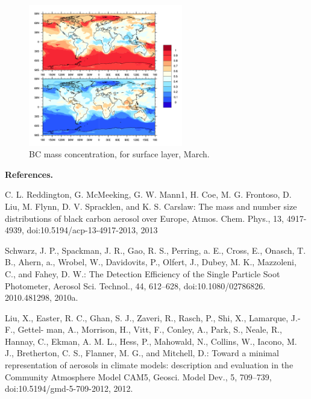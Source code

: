 \documentclass[11pt]{article}
\begin{document}
\begin{figure}[!h] 
	\begin{center}
		\includegraphics[width = 0.6\textwidth]{Rplot04}
		\caption[]{\label{fig_P3}BC mass concentration, for surface layer, March.}
	\end{center}
\end{figure}



\clearpage
\noindent \textbf{References. }

C. L. Reddington, G. McMeeking, G. W. Mann1, H. Coe, M. G. Frontoso, D. Liu, M. Flynn, D. V. Spracklen, and K. S. Carslaw: The mass and number size distributions of black carbon aerosol over Europe, Atmos. Chem. Phys., 13, 4917-4939, doi:10.5194/acp-13-4917-2013, 2013

Schwarz, J. P., Spackman, J. R., Gao, R. S., Perring, a. E., Cross, E., Onasch, T. B., Ahern, a., Wrobel, W., Davidovits, P., Olfert, J., Dubey, M. K., Mazzoleni, C., and Fahey, D. W.: The Detection Efficiency of the Single Particle Soot Photometer, Aerosol Sci. Technol., 44, 612–628, doi:10.1080/02786826. 2010.481298, 2010a.

Liu, X., Easter, R. C., Ghan, S. J., Zaveri, R., Rasch, P., Shi, X., Lamarque, J.-F., Gettel- man, A., Morrison, H., Vitt, F., Conley, A., Park, S., Neale, R., Hannay, C., Ekman, A. M. L., Hess, P., Mahowald, N., Collins, W., Iacono, M. J., Bretherton, C. S., Flanner, M. G., and Mitchell, D.: Toward a minimal representation of aerosols in climate models: description and evaluation in the Community Atmosphere Model CAM5, Geosci. Model Dev., 5, 709–739, doi:10.5194/gmd-5-709-2012, 2012.








\end{document}
